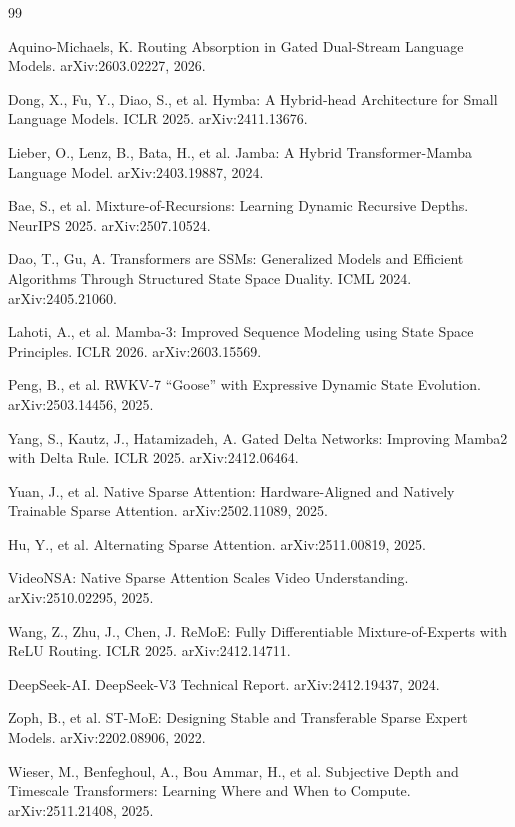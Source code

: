\documentclass[11pt,a4paper]{article}
\begin{document}
\begin{thebibliography}{99}

 Aquino-Michaels, K.
Routing Absorption in Gated Dual-Stream Language Models.
arXiv:2603.02227, 2026.

 Dong, X., Fu, Y., Diao, S., et al. Hymba: A Hybrid-head
Architecture for Small Language Models. ICLR 2025. arXiv:2411.13676.

 Lieber, O., Lenz, B., Bata, H., et al. Jamba: A Hybrid
Transformer-Mamba Language Model. arXiv:2403.19887, 2024.

 Bae, S., et al. Mixture-of-Recursions: Learning Dynamic
Recursive Depths. NeurIPS 2025. arXiv:2507.10524.

 Dao, T., Gu, A. Transformers are SSMs: Generalized
Models and Efficient Algorithms Through Structured State Space Duality.
ICML 2024. arXiv:2405.21060.

 Lahoti, A., et al. Mamba-3: Improved Sequence Modeling
using State Space Principles. ICLR 2026. arXiv:2603.15569.

 Peng, B., et al. RWKV-7 ``Goose'' with Expressive
Dynamic State Evolution. arXiv:2503.14456, 2025.

 Yang, S., Kautz, J., Hatamizadeh, A. Gated Delta
Networks: Improving Mamba2 with Delta Rule. ICLR 2025. arXiv:2412.06464.

 Yuan, J., et al. Native Sparse Attention:
Hardware-Aligned and Natively Trainable Sparse Attention.
arXiv:2502.11089, 2025.

 Hu, Y., et al. Alternating Sparse Attention.
arXiv:2511.00819, 2025.

 VideoNSA: Native Sparse Attention Scales Video
Understanding. arXiv:2510.02295, 2025.

 Wang, Z., Zhu, J., Chen, J. ReMoE: Fully Differentiable
Mixture-of-Experts with ReLU Routing. ICLR 2025. arXiv:2412.14711.

 DeepSeek-AI. DeepSeek-V3 Technical Report.
arXiv:2412.19437, 2024.

 Zoph, B., et al. ST-MoE: Designing Stable and
Transferable Sparse Expert Models. arXiv:2202.08906, 2022.

 Wieser, M., Benfeghoul, A., Bou Ammar, H., et al.
Subjective Depth and Timescale Transformers: Learning Where and When to
Compute. arXiv:2511.21408, 2025.


\end{thebibliography}
\end{document}
